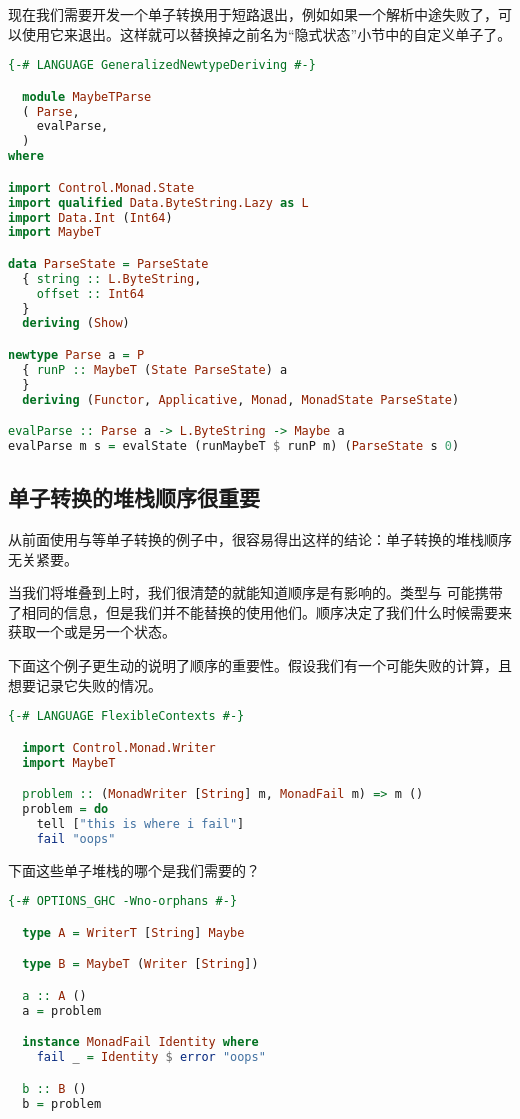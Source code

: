 \documentclass[./main.tex]{subfiles}
\begin{document}
现在我们需要开发一个单子转换用于短路退出，例如如果一个解析中途失败了，可以使用它来退出。这样就可以替换掉之前名为“隐式状态”小节中的自定义单子了。

\begin{lstlisting}[language=Haskell]
  {-# LANGUAGE GeneralizedNewtypeDeriving #-}

  module MaybeTParse
  ( Parse,
    evalParse,
  )
where

import Control.Monad.State
import qualified Data.ByteString.Lazy as L
import Data.Int (Int64)
import MaybeT

data ParseState = ParseState
  { string :: L.ByteString,
    offset :: Int64
  }
  deriving (Show)

newtype Parse a = P
  { runP :: MaybeT (State ParseState) a
  }
  deriving (Functor, Applicative, Monad, MonadState ParseState)

evalParse :: Parse a -> L.ByteString -> Maybe a
evalParse m s = evalState (runMaybeT $ runP m) (ParseState s 0)

\end{lstlisting}

\subsection*{单子转换的堆栈顺序很重要}

从前面使用与等单子转换的例子中，很容易得出这样的结论：单子转换的堆栈顺序无关紧要。

当我们将堆叠到上时，我们很清楚的就能知道顺序是有影响的。类型与
可能携带了相同的信息，但是我们并不能替换的使用他们。顺序决定了我们什么时候需要来获取一个或是另一个状态。

下面这个例子更生动的说明了顺序的重要性。假设我们有一个可能失败的计算，且想要记录它失败的情况。

\begin{lstlisting}[language=Haskell]
  {-# LANGUAGE FlexibleContexts #-}

  import Control.Monad.Writer
  import MaybeT

  problem :: (MonadWriter [String] m, MonadFail m) => m ()
  problem = do
    tell ["this is where i fail"]
    fail "oops"
\end{lstlisting}

下面这些单子堆栈的哪个是我们需要的？

\begin{lstlisting}[language=Haskell]
  {-# OPTIONS_GHC -Wno-orphans #-}

  type A = WriterT [String] Maybe

  type B = MaybeT (Writer [String])

  a :: A ()
  a = problem

  instance MonadFail Identity where
    fail _ = Identity $ error "oops"

  b :: B ()
  b = problem
\end{lstlisting}
\end{document}
